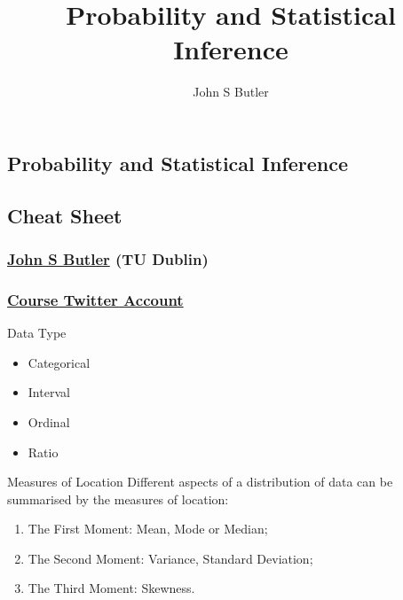 \documentclass[10pt,a4paper]{article}
\title{Probability and Statistical Inference}
\author{John S Butler }
\begin{document}
\small
\begin{multicols}{3}

\scriptsize


\section*{Probability and Statistical Inference}
\subsection*{Cheat Sheet}

\subsubsection*{\href{johnsbutler.netlify.com}{John S Butler} (TU Dublin) }
\subsubsection*{\href{https://twitter.com/StatisticalInf1}{Course Twitter Account} }
\begin{textbox}{Data Type}
\begin{multicols}{2}
\begin{itemize}
  \item Categorical
  \item Interval
  \item Ordinal
  \item Ratio
\end{itemize}

\end{multicols}

\end{textbox}


\begin{textbox}{Measures of Location}
Different aspects of a distribution of data can be summarised by the measures of location:
\begin{enumerate}
    \item The First Moment: Mean, Mode or Median;
    \item  The Second Moment: Variance, Standard Deviation;
    \item  The Third Moment: Skewness.
\end{enumerate}


\end{textbox}
\end{multicols}
\end{document}
